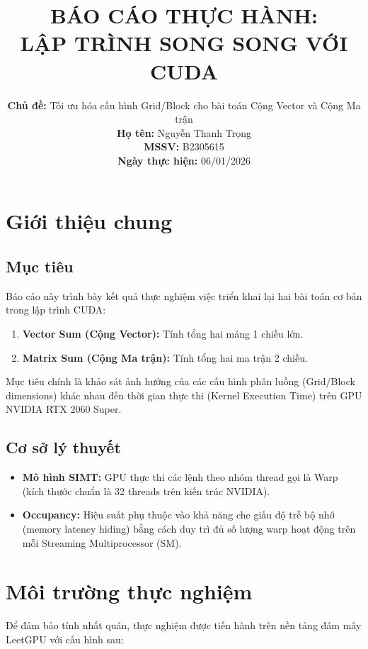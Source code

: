 \documentclass{article}
\title{\textbf{BÁO CÁO THỰC HÀNH: \\ LẬP TRÌNH SONG SONG VỚI CUDA}}
\author{
        \textbf{Chủ đề:} Tối ưu hóa cấu hình Grid/Block cho bài toán Cộng Vector và Cộng Ma trận \\[0.3cm]
        \textbf{Họ tên:} Nguyễn Thanh Trọng \\
        \textbf{MSSV:} B2305615 \\
        \textbf{Ngày thực hiện:} 06/01/2026
    }
\date{}
\begin{document}
    \maketitle
    \thispagestyle{empty}

    \section{Giới thiệu chung}

    \subsection{Mục tiêu}

    Báo cáo này trình bày kết quả thực nghiệm việc triển khai lại hai bài toán cơ bản trong lập trình CUDA:

    \begin{enumerate}
        \item \textbf{Vector Sum (Cộng Vector):} Tính tổng hai mảng 1 chiều lớn.
        \item \textbf{Matrix Sum (Cộng Ma trận):} Tính tổng hai ma trận 2 chiều.
    \end{enumerate}

    Mục tiêu chính là khảo sát ảnh hưởng của các cấu hình phân luồng (Grid/Block dimensions) khác nhau đến thời gian thực thi (Kernel Execution Time) trên GPU NVIDIA RTX 2060 Super.

    \subsection{Cơ sở lý thuyết}

    \begin{itemize}
        \item \textbf{Mô hình SIMT:} GPU thực thi các lệnh theo nhóm thread gọi là Warp (kích thước chuẩn là 32 threads trên kiến trúc NVIDIA).
        \item \textbf{Occupancy:} Hiệu suất phụ thuộc vào khả năng che giấu độ trễ bộ nhớ (memory latency hiding) bằng cách duy trì đủ số lượng warp hoạt động trên mỗi Streaming Multiprocessor (SM).
    \end{itemize}

    \section{Môi trường thực nghiệm}

    Để đảm bảo tính nhất quán, thực nghiệm được tiến hành trên nền tảng đám mây LeetGPU với cấu hình sau:
\end{document}
